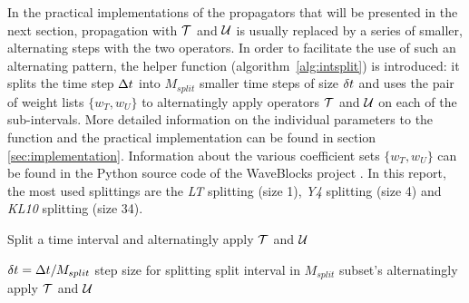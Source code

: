 %
In the practical implementations of the propagators that will be presented in the next section, propagation with $\mathcal{T}$ and $\mathcal{U}$ is usually replaced by a series of smaller, alternating steps with the two operators.
In order to facilitate the use of such an alternating pattern, the helper function  (algorithm~\ref{alg:intsplit}) is introduced:
it splits the time step $\Delta t$ into $M_{split}$ smaller time steps of size $\delta t$ and uses the pair of weight lists $\{ w_T, w_U \}$ to alternatingly apply operators $\mathcal{T}$ and $\mathcal{U}$ on each of the sub-intervals.
More detailed information on the individual parameters to the  function and the practical implementation can be found in section \ref{sec:implementation}.
Information about the various coefficient sets $\{w_T, w_U\}$ can be found in the Python source code of the WaveBlocks project \cite{libwaveblocks}.
In this report, the most used splittings are the \emph{LT} splitting (size 1), \emph{Y4} splitting (size 4) and \emph{KL10} splitting (size 34).
%
\begin{algorithm}[ht]
	\caption{Split a time interval and alternatingly apply $\mathcal{T}$ and $\mathcal{U}$}
	\label{alg:intsplit}
	\begin{algorithmic}
		\State
			\State
			\State $\delta t = \Delta t/M_{split}$
			\Comment step size for splitting
			\Comment split interval in $M_{split}$ subset's
				\Comment alternatingly apply $\mathcal{T}$ and $\mathcal{U}$
					\State {}
					\State {}
				\EndFor
			\EndFor
		\State
		\EndProcedure
	\end{algorithmic}
\end{algorithm}


